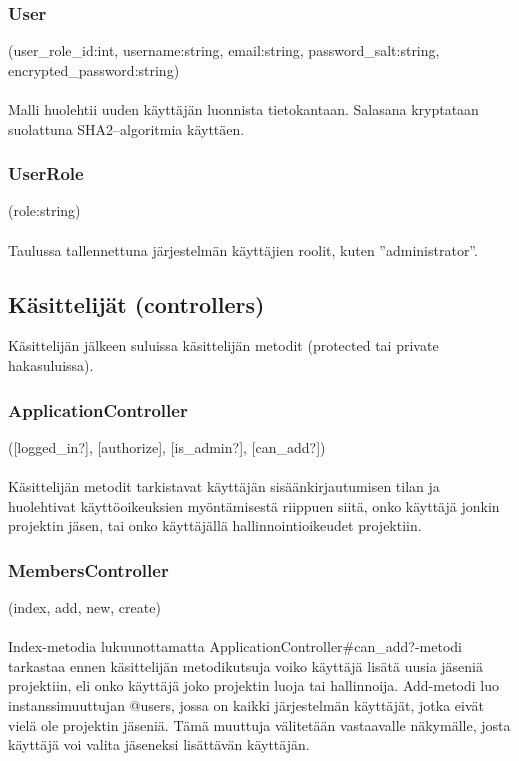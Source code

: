 \documentclass[12pt,a4paper]{article}
\begin{document}
\subsubsection*{User}
(user\_role\_id:int, username:string, email:string, password\_salt:string,
encrypted\_password:string)\\\\
Malli huolehtii uuden käyttäjän luonnista tietokantaan. Salasana kryptataan suolattuna
SHA2--algoritmia käyttäen.
\subsubsection*{UserRole}
(role:string)\\\\
Taulussa tallennettuna järjestelmän käyttäjien roolit, kuten ”administrator”.
\subsection*{Käsittelijät (controllers)}
Käsittelijän jälkeen suluissa käsittelijän metodit (protected tai private hakasuluissa).
\subsubsection*{ApplicationController}
([logged\_in?], [authorize], [is\_admin?], [can\_add?])\\\\
Käsittelijän metodit tarkistavat käyttäjän sisäänkirjautumisen tilan ja huolehtivat
käyttöoikeuksien myöntämisestä riippuen siitä, onko käyttäjä jonkin projektin jäsen, tai
onko käyttäjällä hallinnointioikeudet projektiin.
\subsubsection*{MembersController}
(index, add, new, create)\\\\
Index-metodia lukuunottamatta ApplicationController\#can\_add?-metodi tarkastaa ennen
käsittelijän metodikutsuja voiko käyttäjä lisätä uusia jäseniä projektiin, eli onko käyttäjä
joko projektin luoja tai hallinnoija.
Add-metodi luo instanssimuuttujan @users, jossa on kaikki järjestelmän käyttäjät, jotka
eivät vielä ole projektin jäseniä. Tämä muuttuja välitetään vastaavalle näkymälle, josta
käyttäjä voi valita jäseneksi lisättävän käyttäjän.
\end{document}
